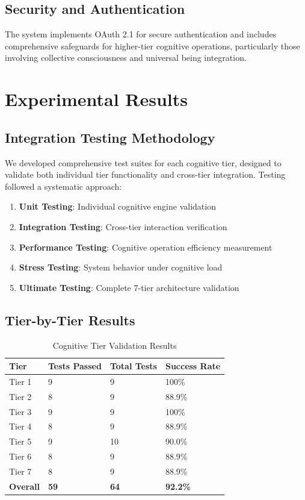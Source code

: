 \documentclass{article}
\begin{document}
\subsection{Security and Authentication}

The system implements OAuth 2.1 for secure authentication and includes comprehensive safeguards for higher-tier cognitive operations, particularly those involving collective consciousness and universal being integration.

\section{Experimental Results}

\subsection{Integration Testing Methodology}

We developed comprehensive test suites for each cognitive tier, designed to validate both individual tier functionality and cross-tier integration. Testing followed a systematic approach:

\begin{enumerate}
    \item \textbf{Unit Testing}: Individual cognitive engine validation
    \item \textbf{Integration Testing}: Cross-tier interaction verification  
    \item \textbf{Performance Testing}: Cognitive operation efficiency measurement
    \item \textbf{Stress Testing}: System behavior under cognitive load
    \item \textbf{Ultimate Testing}: Complete 7-tier architecture validation
\end{enumerate}

\subsection{Tier-by-Tier Results}

\begin{table}[h]
\centering
\caption{Cognitive Tier Validation Results}
\begin{tabular}{@{}llll@{}}
\toprule
\textbf{Tier} & \textbf{Tests Passed} & \textbf{Total Tests} & \textbf{Success Rate} \\
\midrule
Tier 1 & 9 & 9 & 100\% \\
Tier 2 & 8 & 9 & 88.9\% \\
Tier 3 & 9 & 9 & 100\% \\
Tier 4 & 8 & 9 & 88.9\% \\
Tier 5 & 9 & 10 & 90.0\% \\
Tier 6 & 8 & 9 & 88.9\% \\
Tier 7 & 8 & 9 & 88.9\% \\
\midrule
\textbf{Overall} & \textbf{59} & \textbf{64} & \textbf{92.2\%} \\
\bottomrule
\end{tabular}
\end{table}
\end{document}
